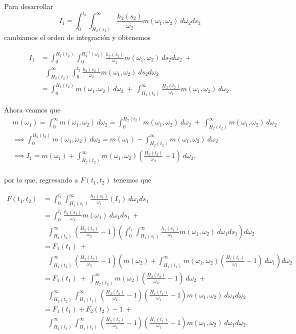 \documentclass[11pt,a4paper]{article}
\begin{document}
\begin{appendices}
Para desarrollar $$I_1 = \int_0^{t_2} \int_{H_2(s_2)}^\infty \frac{h_2(s_2)}{\omega_2} m(\omega_1, \omega_2) \ d\omega_2 ds_2$$ cambiamos el orden de integración y obtenemos

\begin{align*}
I_1 &= \int_0^{H_2(t_2)}\int_0^{H_2^{-1}(\omega_2)} \frac{h_2(s_2)}{\omega_2}m(\omega_1, \omega_2) \ ds_2 d\omega_2 \ +\\
& \ \ \ \int_{H_2(t_2)}^\infty \int_0^{t_2} \frac{h_2(s_2)}{\omega_2}m(\omega_1, \omega_2) \ ds_2 d\omega_2\\
&= \int_0^{H_2(t_2)} m(\omega_1, \omega_2) \ d\omega_2 \ + \ \int_{H_2(t_2)}^\infty \frac{H_2(t_2)}{\omega_2}m(\omega_1, \omega_2) \ d\omega_2.
\end{align*}

Ahora veamos que
\begin{align*}
&m(\omega_1) = \int_0^\infty m(\omega_1, \omega_2) \ d\omega_2 = \int_0^{H_2(t_2)} m(\omega_1, \omega_2) \ d\omega_2 \ + \ \int_{H_2(t_2)}^\infty m(\omega_1, \omega_2) \ d\omega_2\\
&\implies \int_0^{H_2(t_2)} m(\omega_1, \omega_2) \ d\omega_2 = m(\omega_1) - \int_{H_2(t_2)}^\infty m(\omega_1, \omega_2) \ d\omega_2\\
&\implies I_1 = m(\omega_1) + \int_{H_2(t_2)}^\infty m(\omega_1, \omega_2) \left( \frac{H_2(t_2)}{\omega_2}-1\right) \ d\omega_2,\\
\end{align*}

por lo que, regresando a $F(t_1, t_2)$ tenemos que

\begin{align*}
F(t_1, t_2) &= \int_0^{t_1} \int_{H_1(s_1)}^\infty \frac{h_1(s_1)}{\omega_1}\left( I_1 \right) \ d\omega_1 ds_1\\
&= \int_0^{t_1} \frac{h_1(s_1)}{\omega_1}m(\omega_1) \ d\omega_1 ds_1 \ +\\ & \ \ \ \int_{H_2(t_2)}^\infty \left(\frac{H_2(t_2)}{\omega_2}-1 \right) \left(\int_0^{t_1}\int_{H_1(s_1)}^\infty \frac{h_1(s_1)}{\omega_1}m(\omega_1, \omega_2) \ d\omega_1 ds_1 \right) d\omega_2\\
&= F_1(t_1) \ + \\
& \ \ \ \int_{H_2(t_2)}^\infty \left(\frac{H_2(t_2)}{\omega_2}-1 \right)\left(m(\omega_2) + \int_{H_1(t_1)}^\infty m(\omega_1, \omega_2) \left(\frac{H_1(t_1)}{\omega_1}-1 \right) \ d\omega_1 \right) d\omega_2\\
&= F_1(t_1) \ + \ \int_{H_2(t_2)}^\infty m(\omega_2) \left( \frac{H_2(t_2)}{\omega_2}-1 \right) \ d\omega_2 \ +\\
& \ \ \ \int_{H_2(t_2)}^\infty\int_{H_1(t_1)}^\infty \left(\frac{H_2(t_2)}{\omega_2}-1\right)\left(\frac{H_1(t_1)}{\omega_1}-1\right) m(\omega_1, \omega_2) \ d\omega_1 d\omega_2\\
&= F_1(t_1) + F_2(t_2) - 1 \ +\\
& \ \ \ \int_{H_2(t_2)}^\infty\int_{H_1(t_1)}^\infty \left(\frac{H_2(t_2)}{\omega_2}-1\right)\left(\frac{H_1(t_1)}{\omega_1}-1\right) m(\omega_1, \omega_2) \ d\omega_1 d\omega_2.\\
\end{align*}


\end{appendices}
\end{document}
